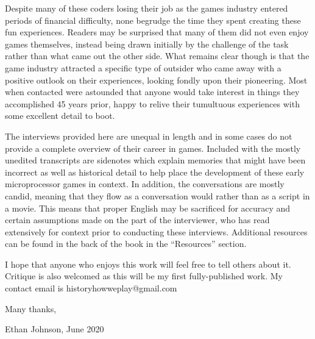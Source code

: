 Despite many of these coders losing their job as the games industry entered periods of financial difficulty, none begrudge the time they spent creating these fun experiences. Readers may be surprised that many of them did not even enjoy games themselves, instead being drawn initially by the challenge of the task rather than what came out the other side. What remains clear though is that the game industry attracted a specific type of outsider who came away with a positive outlook on their experiences, looking fondly upon their pioneering. Most when contacted were astounded that anyone would take interest in things they accomplished 45 years prior, happy to relive their tumultuous experiences with some excellent detail to boot.

The interviews provided here are unequal in length and in some cases do not provide a complete overview of their career in games. Included with the mostly unedited transcripts are sidenotes which explain memories that might have been incorrect as well as historical detail to help place the development of these early microprocessor games in context. In addition, the conversations are mostly candid, meaning that they flow as a conversation would rather than as a script in a movie. This means that proper English may be sacrificed for accuracy and certain assumptions made on the part of the interviewer, who has read extensively for context prior to conducting these interviews. Additional resources can be found in the back of the book in the “Resources” section.

I hope that anyone who enjoys this work will feel free to tell others about it. Critique is also welcomed as this will be my first fully-published work. My contact email is historyhowweplay@gmail.com

Many thanks,

Ethan Johnson, June 2020
